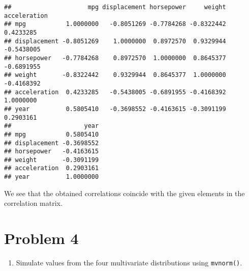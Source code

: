 \documentclass[
]{article}
\providecommand{\tightlist}{%
  \setlength{\itemsep}{0pt}\setlength{\parskip}{0pt}}
\begin{document}
\begin{verbatim}
##                     mpg displacement horsepower     weight acceleration
## mpg           1.0000000   -0.8051269 -0.7784268 -0.8322442    0.4233285
## displacement -0.8051269    1.0000000  0.8972570  0.9329944   -0.5438005
## horsepower   -0.7784268    0.8972570  1.0000000  0.8645377   -0.6891955
## weight       -0.8322442    0.9329944  0.8645377  1.0000000   -0.4168392
## acceleration  0.4233285   -0.5438005 -0.6891955 -0.4168392    1.0000000
## year          0.5805410   -0.3698552 -0.4163615 -0.3091199    0.2903161
##                    year
## mpg           0.5805410
## displacement -0.3698552
## horsepower   -0.4163615
## weight       -0.3091199
## acceleration  0.2903161
## year          1.0000000
\end{verbatim}

We see that the obtained correlations coincide with the given elements
in the correlation matrix.

\hypertarget{problem-4}{%
\section{Problem 4}\label{problem-4}}

\begin{enumerate}
\def\labelenumi{\alph{enumi})}
\tightlist
\item
  Simulate values from the four multivariate distributions using
  \texttt{mvnorm()}.
\end{enumerate}
\end{document}
